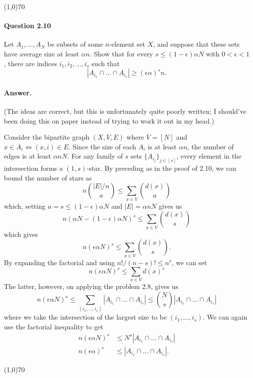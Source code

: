 \begin{center}
	\line(1,0){70}
\end{center}

\paragraph{Question 2.10} Let $A_1,\dots, A_N$ be subsets of some $n$-element set $X$, and suppose that these sets have average size at least $\alpha n$. Show that for every $s\leq (1-\epsilon)\alpha N$ with $0<\epsilon<1$, there are indices $i_1, i_2,\dots, i_s$ such that 
$$|A_{i_1}\cap\dots\cap A_{i_s}|\geq (\epsilon\alpha)^sn.$$

\paragraph{Answer.} (The ideas are correct, but this is unfortunately quite poorly written; I should've been doing this on paper instead of trying to work it out in my head.)

Consider the bipartite graph $(X, V, E)$ where $V = [N]$ and $x\in A_i\iff (x,i)\in E$. Since the size of each $A_i$ is at least $\alpha n$, the number of edges is at least $\alpha nN$. For any family of $s$ sets $\{A_{i_j}\}_{j\in[s]}$, every element in the intersection forms a $(1, s)$-star. By preceding as in the proof of 2.10, we can bound the number of stars as
$$n\binom{|E|/n}{a}\leq \sum_{x\in V}\binom{d(x)}{a}$$
which, setting $a=s\leq (1-\epsilon)\alpha N$ and $|E|=\alpha nN$ gives us
$$n(\alpha N - (1-\epsilon)\alpha N)^s\leq\sum_{x\in V}\binom{d(x)}{s}$$
which gives 
$$n(\epsilon\alpha N)^s\leq \sum_{x\in V}\binom{d(x)}{s}.$$
By expanding the factorial and using $n!/(n-s)!\leq n^s$, we can set
$$n(\epsilon\alpha N)^s\leq \sum_{x\in V} d(x)^s$$
The latter, however, on applying the problem 2.8, gives us
$$n(\epsilon\alpha N)^s\leq\sum_{(i_1,\dots, i_s)}|A_{i_1}\cap\dots\cap A_{i_s}|\leq \binom{N}{s}|A_{i_1}\cap\dots\cap A_{i_s}|$$
where we take the intersection of the largest size to be $(i_1,\dots,i_s)$. We can again use the factorial inequality to get
\begin{align*}
	n(\epsilon\alpha N)^s&\leq N^{s}|A_{i_1}\cap\dots\cap A_{i_s}|\\
	n(\epsilon\alpha)^s&\leq |A_{i_1}\cap\dots\cap A_{i_s}|.
\end{align*}

\begin{center}
	\line(1,0){70}
\end{center}

